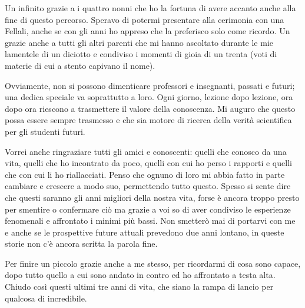 \documentclass[12pt,a4paper,twoside]{book}
\begin{document}
Un infinito grazie a i quattro nonni che ho la fortuna di avere accanto anche alla fine di questo percorso. Speravo di potermi presentare alla cerimonia con una Fellali, anche se con gli anni ho appreso che la preferisco solo come ricordo. Un grazie anche a tutti gli altri parenti che mi hanno ascoltato durante le mie lamentele di un diciotto e condiviso i momenti di gioia di un trenta (voti di materie di cui a stento capivano il nome).

Ovviamente, non si possono dimenticare professori e insegnanti, passati e futuri; una dedica speciale va soprattutto a loro. Ogni giorno, lezione dopo lezione, ora dopo ora riescono a trasmettere il valore della conoscenza. Mi auguro che questo possa essere sempre trasmesso e che sia motore di ricerca della verità scientifica per gli studenti futuri.

Vorrei anche ringraziare tutti gli amici e conoscenti: quelli che conosco da una vita, quelli che ho incontrato da poco, quelli con cui ho perso i rapporti e quelli che con cui li ho riallacciati. Penso che ognuno di loro mi abbia fatto in parte cambiare e crescere a modo suo, permettendo tutto questo. Spesso si sente dire che questi saranno gli anni migliori della nostra vita, forse è ancora troppo presto per smentire o confermare ciò ma grazie a voi so di aver condiviso le esperienze fenomenali e affrontato i minimi più bassi. Non smetterò mai di portarvi con me e anche se le prospettive future attuali prevedono due anni lontano, in queste storie non c'è ancora scritta la parola fine.

Per finire un piccolo grazie anche a me stesso, per ricordarmi di cosa sono capace, dopo tutto quello a cui sono andato in contro ed ho affrontato a testa alta. Chiudo così questi ultimi tre anni di vita, che siano la rampa di lancio per qualcosa di incredibile.
\end{document}
